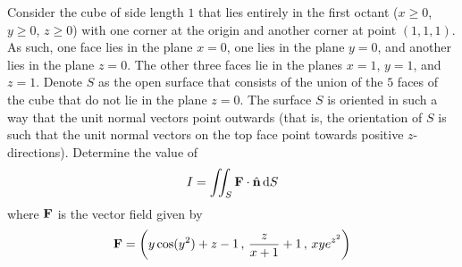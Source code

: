 
\begin{question}[M317 2016A] %
Consider the cube of side length $1$ that lies entirely in the first octant 
($x $, $y $, $z $) with one corner at the origin and 
another corner at point $(1, 1, 1)$. As such, one face lies in the plane 
$x = 0$, one lies in the plane $y = 0$, and another lies in the plane $z = 0$. 
The other three faces lie in the planes $x = 1$, $y = 1$, and $z = 1$.
Denote $S$ as the open surface that consists of the union of the $5$ 
faces of the cube that do not lie in the plane $z = 0$. The surface $S$ 
is oriented in such a way that the unit normal vectors point outwards 
(that is, the orientation of $S$ is such that the unit normal
vectors on the top face point towards positive $z$-directions). 
Determine the value of
\begin{equation*}
I=\iint_S \mathbf{F} \cdot\hat{\mathbf{n}}\, \mathrm{d}S 
\end{equation*}
where $\mathbf{F}$ is the vector field given by
\begin{equation*}
\mathbf{F} = \left(y \cos(y^2) + z - 1\,,\, \frac{z}{x+1}+1\,,\, xy e^{z^2}\right)
\end{equation*}
\end{question}

